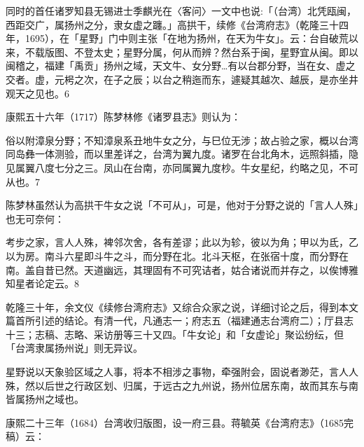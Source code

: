 同时的首任诸罗知县无锡进士季麒光在〈客问〉一文中也说:「（台湾）北凭瓯闽，西距交广，属扬州之分，隶女虚之躔。」高拱干，续修《台湾府志》（乾隆三十四年，1695），在「星野」门中则主张「在地为扬州，在天为牛女」。云：台自破荒以来，不载版图、不登太史；星野分属，何从而辨？然台系于闽，星野宜从闽。即以闽稽之，福建「禹贡」扬州之域，天文牛、女分野…有以台郡分野，当在女、虚之交者。虚，元枵之次，在子之辰；以台之稍迤而东，遽疑其越次、越辰，是亦坐井观天之见也。6

康熙五十六年（1717）陈梦林修《诸罗县志》则认为：

俗以附漳泉分野；不知漳泉系丑地牛女之分，与巳位无涉；故占验之家，概以台湾同岛彝一体测验，而以里差详之，台湾为翼九度。诸罗在台北角木，远照斜插，隐见属翼八度七分之三。凤山在台南，亦同属翼九度杪。牛女星纪，约略之见，不可从也。7

陈梦林虽然认为高拱干牛女之说「不可从」，可是，他对于分野之说的「言人人殊」也无可奈何：

\vfill
\begin{BookNotes}
\end{BookNotes}

\begin{BookQuote}
考步之家，言人人殊，裨邻次舍，各有差谬；此以为轸，彼以为角；甲以为氐，乙以为房。南斗六星即斗牛之斗，而分野在北。北斗天枢，在张宿十度，而分野在南。盖自昔已然。天道幽远，其理固有不可究诘者，姑合诸说而并存之，以俟博雅知星者论定云。8
\end{BookQuote}

乾隆三十年，余文仪《续修台湾府志》又综合众家之说，详细讨论之后，得到本文篇首所引述的结论。有清一代，凡通志一；府志五（福建通志台湾府二）；厅县志十三；志稿、志略、采访册等三十又四。「牛女论」和「女虚论」聚讼纷纭，但「台湾隶属扬州说」则无异议。

星野说以天象验区域之人事，将本不相涉之事物，牵强附会，固说者渺茫，言人人殊，然以后世之行政区划、归属，于远古之九州说，扬州位居东南，故而其东与南皆属扬州之域也。


康熙二十三年（1684）台湾收归版图，设一府三县。蒋毓英《台湾府志》（1685完稿）云：

